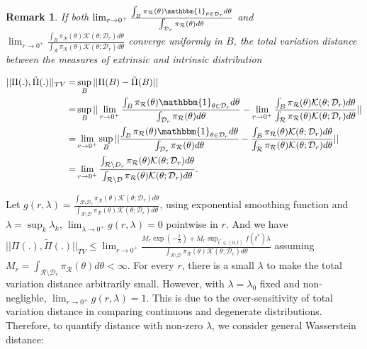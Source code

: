 \documentclass[10pt]{article}
\newtheorem{remark}{Remark}
\newcommand{\mc}[1]{\mathcal{#1}}
\DeclareMathOperator{\1}{\mathbbm{1}}
\begin{document}
\begin{remark}
If both $\lim_{r\rightarrow 0^+} \frac{\int_{B} \pi_{\mc R}(\theta) \mathbbm{1}_{\theta\in \mc D_r} d\theta}{ \int_{\mc D_r} \pi_{\mc R}(\theta)d\theta }$ and $ \lim_{r\rightarrow 0^+}\frac{\int_{B} \pi_{\mc R}(\theta) \mc K({\theta; \mc D_r}) d\theta}{ \int_{\mc R} \pi_{\mc R}(\theta)  \mc K({\theta; \mc D_r}) d\theta }  $ converge uniformly in $B$, the total variation distance between the measures of extrinsic and intrinsic distribution

\begin{equation}
	\begin{aligned}
	||\Pi(.), \tilde{\Pi}(.) ||_{TV}
	= &\sup_{B} ||\Pi(B)- \tilde{\Pi}(B)||\\
	= & \sup_{B}|| \lim_{r\rightarrow 0^+} \frac{\int_{B} \pi_{\mc R}(\theta) \mathbbm{1}_{\theta\in \mc D_r} d\theta}{ \int_{\mc D_r} \pi_{\mc R}(\theta)d\theta }-  \lim_{r\rightarrow 0^+}\frac{\int_{B} \pi_{\mc R}(\theta) \mc K({\theta; \mc D_r}) d\theta}{ \int_{\mc R} \pi_{\mc R}(\theta)  \mc K({\theta; \mc D_r}) d\theta } || \\
	= & \lim_{r\rightarrow 0^+} \sup_{B}|| \frac{\int_{B} \pi_{\mc R}(\theta) \mathbbm{1}_{\theta\in \mc D_r} d\theta}{ \int_{\mc D_r} \pi_{\mc R}(\theta)d\theta }-  \frac{\int_{B} \pi_{\mc R}(\theta) \mc K({\theta; \mc D_r}) d\theta}{ \int_{\mc R} \pi_{\mc R}(\theta)  \mc K({\theta; \mc D_r}) d\theta } || \\
	=& \lim_{r\rightarrow 0^+}  \frac{\int_{\mc R \setminus \mc \mc D_r} \pi_{\mc R}(\theta) \mc K(\theta;\mc D_r)d\theta}{\int_{\mc R \setminus \mc D} \pi_{\mc R}(\theta) \mc K(\theta;\mc D_r)d\theta}.
	\end{aligned}
\end{equation}
\end{remark}

 Let $g(r,\lambda)=
\frac{\int_{\mc R \setminus \mc  D_r} \pi_{\mc R}(\theta) \mc K(\theta;\mc D_r)d\theta}{\int_{\mc R \setminus \mc D} \pi_{\mc R}(\theta) \mc K(\theta;\mc D_r)d\theta}$, using exponential smoothing function and $\lambda = \sup_k\lambda_k$, $\lim_{\lambda\rightarrow 0^+}g(r,\lambda)=0$ pointwise in $r$. And we have  $||\Pi(.), \tilde{\Pi}(.) ||_{TV}\le \lim_{r\rightarrow 0^+}\frac{{M_r} \exp(-\frac{t}{\lambda}) + {M_r} \sup_{t^*\in(0,t)} {f(t^*)}\lambda }{\int_{\mc R  \setminus \mc D} \pi_{\mc R}(\theta) \mc K(\theta;\mc D_{r})d\theta}$ assuming $M_r= \int_{\mc R \setminus \mc D_{r}} \pi_{\mc R }(\theta) d\theta<\infty$. For every $r$, there is a small $\lambda$ to make the total variation distance arbitrarily small. However, with $\lambda=\lambda_0$ fixed and non-negligble, $\lim_{r\rightarrow 0^+}g(r,\lambda)=1$. This is due to the over-sensitivity of total variation distance in comparing continuous and degenerate distributions. Therefore, to quantify distance with non-zero $\lambda$, we consider general Wasserstein distance:
\end{document}
